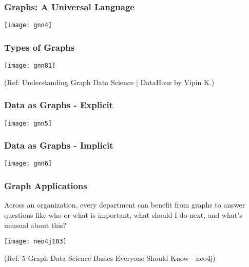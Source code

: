 \begin{frame}[fragile]\frametitle{Graphs: A Universal Language }

\begin{center}
\texttt{[image: gnn4]}
\end{center}	  

\end{frame}

\begin{frame}[fragile]\frametitle{Types of Graphs}

\begin{center}
\texttt{[image: gnn81]}

{\tiny (Ref: Understanding Graph Data Science | DataHour by Vipin K.)}
\end{center}	  

\end{frame}


\begin{frame}[fragile]\frametitle{Data as Graphs - Explicit }

\begin{center}
\texttt{[image: gnn5]}
\end{center}	  

\end{frame}

\begin{frame}[fragile]\frametitle{Data as Graphs - Implicit }

\begin{center}
\texttt{[image: gnn6]}
\end{center}	  

\end{frame}


\begin{frame}\frametitle{ Graph Applications }

Across an organization, every department can benefit from graphs to answer questions 
like who or what is important, what should I do next, and what’s unusual about this?

\begin{center}
\texttt{[image: neo4j103]}
\end{center}	  


{\tiny (Ref: 5 Graph Data Science Basics Everyone Should Know - neo4j)}
\end{frame}

